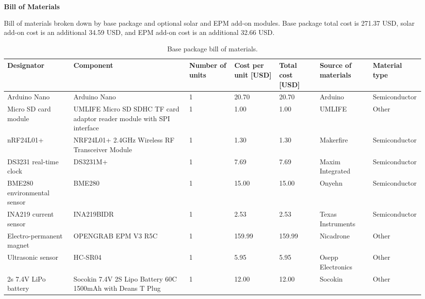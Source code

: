 \documentclass[11pt,letterpaper]{article}
\begin{document}
	
	\begin{center}
		{\Large\textbf{Bill of Materials}}
	\end{center}

\noindent Bill of materials broken down by base package and optional solar and EPM add-on modules. Base package total cost is 271.37 USD, solar add-on cost is an additional 34.59 USD, and EPM add-on cost is an additional 32.66 USD.

\setlength{\abovedisplayskip}{3pt}
\setlength{\belowdisplayskip}{3pt}

\begin{longtable}{ p{1.75cm} p{4cm} p{1.25cm} p{1cm} p{1cm} p{2cm} p{2.5cm} }	
	\caption{Base package bill of materials.} 
	\label{components} \\
	\toprule
	Designator & Component & Number of units & Cost per unit [USD] & Total cost [USD] & Source of materials & Material type \\
	\midrule
	Arduino Nano & Arduino Nano & 1 & 20.70 & 20.70 & Arduino & Semiconductor \\
	
	\rowcolor[gray]{0.925}
	Micro SD card module & UMLIFE Micro SD SDHC TF card adaptor reader module with SPI interface & 1 & 1.00 & 1.00 & UMLIFE & Other \\
	
	nRF24L01+ & NRF24L01+ 2.4GHz Wireless RF Transceiver Module & 1 & 1.30 & 1.30 & Makerfire & Semiconductor \\ 
	
	\rowcolor[gray]{0.925}
	DS3231 real-time clock & DS3231M+ & 1 & 7.69 & 7.69 & Maxim Integrated & Semiconductor \\ 
	
	BME280 environmental sensor & BME280 & 1 & 15.00 & 15.00 & Onyehn & Semiconductor \\ 
	
	\rowcolor[gray]{0.925}
	INA219 current sensor & INA219BIDR & 1 & 2.53 & 2.53 & Texas Instruments & Semiconductor \\ 
	
	Electro-permanent magnet & OPENGRAB EPM V3 R5C & 1 & 159.99 & 159.99 & Nicadrone & Other \\ 
	
	\rowcolor[gray]{0.925}
	Ultrasonic sensor & HC-SR04 & 1 & 5.95 & 5.95 & Osepp Electronics & Other \\
	
	2s 7.4V LiPo battery & Socokin 7.4V 2S Lipo Battery 60C 1500mAh with Deans T Plug & 1 & 12.00 & 12.00 & Socokin & Other \\
	

\end{longtable}
\end{document}
